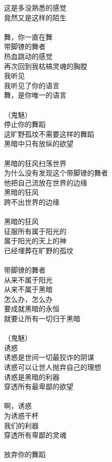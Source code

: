 这是多没熟悉的感觉\\
竟然又是这样的陌生\\
\\
舞，你一直在舞\\
带脚镣的舞者\\
热血跳动的感觉\\
再次回到我枯槁灵魂的胸膛\\
我听见\\
我听见了你的语言\\
舞，是你唯一的语言\\
\\
（鬼魅）\\
停止你的舞蹈\\
这旷野孤坟不需要这样的舞蹈\\
黑暗中只有放纵的欲望\\
\\
黑暗的狂风扫荡世界\\
为什么没有发现这个带脚镣的舞者\\
他把自己流放在世界的边缘\\
黑暗的狂风\\
跨不出世界的边缘\\
\\
黑暗的狂风\\
征服所有属于阳光的\\
属于阳光的天上的神\\
已经埋葬在旷野的孤坟\\
\\
带脚镣的舞者\\
从来不属于阳光\\
从来不属于黑暗\\
怎么办，怎么办\\
要成就黑暗的永恒\\
就要让所有一切归于黑暗\\
\\
（鬼魅）\\
诱惑\\
诱惑是世间一切最狡诈的阴谋\\
诱惑可以让世人抛弃自己的理想\\
诱惑是黑暗的利器\\
穿透所有最卑鄙的欲望\\
\\
啊，诱惑\\
为诱惑干杯\\
我们的利器\\
穿透所有卑鄙的灵魂\\
\\
放弃你的舞蹈\\

